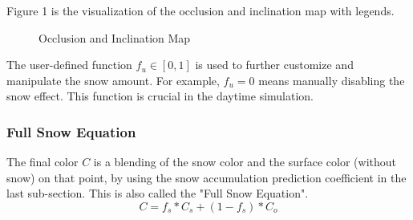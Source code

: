 \documentclass{article}
\begin{document}
Figure 1 is the visualization of the occlusion and inclination map with legends. 

\begin{figure}[h]
  \centering
  \caption{Occlusion and Inclination Map}
  \label{fig:Maps}
\end{figure}



The user-defined function \( f_{u} \in [0, 1]\) is used to further customize and manipulate the snow amount. For example, 
\( f_{u}=0 \) means manually disabling the snow effect. This function is crucial in the daytime simulation.

\subsubsection {Full Snow Equation}
The final color \( C \) is a blending of the snow color and the surface color (without snow) on that point, by using the snow accumulation 
prediction coefficient in the last sub-section. This is also called the "Full Snow Equation".
\[
  C = f_{s} * C_{s} + (1-f_{s}) * C_{o}
\]
\end{document}
